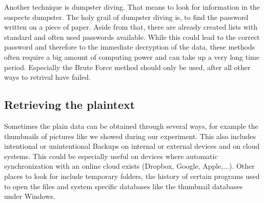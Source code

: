 Another technique is dumpster diving.
That means to look for information in the suspects dumpster. 
The holy grail of dumpster diving is, to find the password written on a piece of paper. 
Aside from that, there are already created lists with standard and often used passwords available.
While this could lead to the correct password and therefore to the immediate decryption of the data, these methods often require a big amount of computing power and can take up a very long time period.
Especially the Brute Force method should only be used, after all other ways to retrival have failed.

\subsection{Retrieving the plaintext}
Sometimes the plain data can be obtained through several ways, for example the thumbnails of pictures like we showed during our experiment. 
This also includes intentional or unintentional Backups on internal or external devices and on cloud systems.
This could be especially useful on devices where automatic synchronization with an online cloud exists (Dropbox, Google, Apple,...). 
Other places to look for include temporary folders, the history of certain programs used to open the files and system specific databases like the thumbnail databases under Windows.
